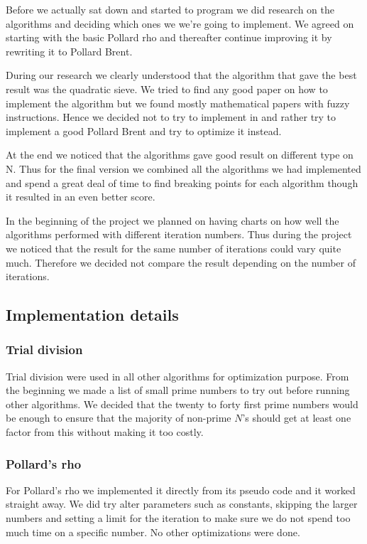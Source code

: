 Before we actually sat down and started to program we did research on the algorithms and deciding which ones we we're going to implement. We agreed on starting with the basic Pollard rho and thereafter continue improving it by rewriting it to Pollard Brent.

During our research we clearly understood that the algorithm that gave the best result was the quadratic sieve. We tried to find any good paper on how to implement the algorithm but we found mostly mathematical papers with fuzzy instructions. Hence we decided not to try to implement in and rather try to implement a good Pollard Brent and try to optimize it instead.

At the end we noticed that the algorithms gave good result on different type on N. Thus for the final version we combined all the algorithms we had implemented and spend a great deal of time to find breaking points for each algorithm though it resulted in an even better score.

In the beginning of the project we planned on having charts on how well the algorithms performed with different iteration numbers. Thus during the project we noticed that the result for the same number of iterations could vary quite much. Therefore we decided not compare the result depending on the number of iterations.

\subsection{Implementation details}

\subsubsection{Trial division}

Trial division were used in all other algorithms for optimization purpose. From the beginning we made a list of small prime numbers to try out before running other algorithms. We decided that the twenty to forty first prime numbers would be enough to ensure that the majority of non-prime $N$'s should get at least one factor from this without making it too costly.

\subsubsection{Pollard's rho}

For Pollard's rho we implemented it directly from its pseudo code and it worked straight away. We did try alter parameters such as constants, skipping the larger numbers and setting a limit for the iteration to make sure we do not spend too much time on a specific number. No other optimizations were done. 

